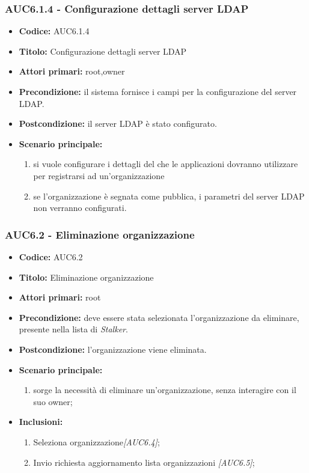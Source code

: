 \documentclass[casi-duso]{subfiles}
\begin{document}
  \subsubsection{AUC6.1.4 - Configurazione dettagli server LDAP}%
  \label{subsub:AUC6.1.4}
  \begin{itemize}
    \item \textbf{Codice:} AUC6.1.4
    \item \textbf{Titolo:} Configurazione dettagli server LDAP
    \item \textbf{Attori primari:} root,owner
    \item \textbf{Precondizione:} il sistema fornisce i campi per la configurazione del server LDAP.
    \item \textbf{Postcondizione:} il server LDAP è stato configurato.
    \item \textbf{Scenario principale:}
    \begin{enumerate}
      \item si vuole configurare i dettagli del  che le applicazioni dovranno utilizzare per registrarsi ad un'organizzazione
      \item se l'organizzazione è segnata come pubblica, i parametri del server LDAP non verranno configurati. 
    \end{enumerate}
  \end{itemize}

\subsubsection{AUC6.2 - Eliminazione organizzazione}%
\label{subsub:AUC6.2}
\begin{itemize}
  \item \textbf{Codice:} AUC6.2
  \item \textbf{Titolo:} Eliminazione organizzazione
  \item \textbf{Attori primari:} root
  \item \textbf{Precondizione:} deve essere stata selezionata l'organizzazione da eliminare, presente nella lista di \emph{Stalker}.
  \item \textbf{Postcondizione:} l'organizzazione viene eliminata.
  \item \textbf{Scenario principale:}
  \begin{enumerate}
    \item sorge la necessità di eliminare un'organizzazione, senza interagire con il suo owner;
  \end{enumerate}
  \item \textbf{Inclusioni:}
  \begin{enumerate}
    \item Seleziona organizzazione\emph{[AUC6.4]};
    \item Invio richiesta aggiornamento lista organizzazioni \emph{[AUC6.5]};
  \end{enumerate}
\end{itemize}
\end{document}
